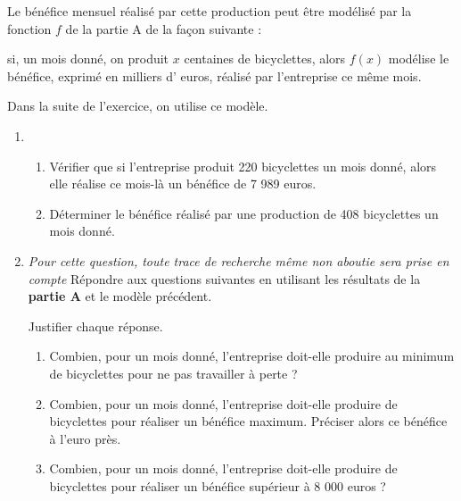 \par
Le bénéfice mensuel réalisé par cette production peut être modélisé par la fonction $f$ de la partie A de la façon suivante :
\par
si, un mois donné, on produit $x$ centaines de bicyclettes, alors $f\left(x\right)$ modélise le bénéfice, exprimé en milliers d' euros, réalisé par l'entreprise ce même mois.
\par
Dans la suite de l'exercice, on utilise ce modèle.
\begin{enumerate}
     \item
     \begin{enumerate}
          \item
          Vérifier que si l'entreprise produit 220 bicyclettes un mois donné, alors elle réalise ce mois-là un bénéfice de 7 989 euros.
          \item
          Déterminer le bénéfice réalisé par une production de 408 bicyclettes un mois donné.
     \end{enumerate}
     \item
     \textit{Pour cette question, toute trace de recherche même non aboutie sera prise en compte}
     Répondre aux questions suivantes en utilisant les résultats de la \textbf{partie A} et le modèle précédent.
     \par
     Justifier chaque réponse.
     \begin{enumerate}
          \item
          Combien, pour un mois donné, l'entreprise doit-elle produire au minimum de bicyclettes pour ne pas travailler à perte ?
          \item
          Combien, pour un mois donné, l'entreprise doit-elle produire de bicyclettes pour réaliser un bénéfice maximum. Préciser alors ce bénéfice à l'euro près.
          \item
          Combien, pour un mois donné, l'entreprise doit-elle produire de bicyclettes pour réaliser un bénéfice supérieur à 8 000 euros ?
     \end{enumerate}
\end{enumerate}
